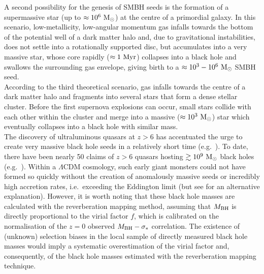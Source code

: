 A second possibility for the genesis of SMBH seeds is the formation of a supermassive star (up to $\approx 10^6~\rm M_\odot$) 
at the centre of a primordial galaxy. 
In this scenario, low-metallicity, low-angular momentum gas infalls towards the bottom of the potential well of a dark matter halo and, 
due to gravitational instabilities, does not settle into a rotationally supported disc, 
but accumulates into a very massive star, 
whose core rapidly ($\approx 1~\rm Myr$) collapses into a black hole and swallows the surrounding gas envelope, 
giving birth to a $\approx 10^3 - 10^6~\rm M_\odot$ SMBH seed. \\

According to the third theoretical scenario, gas infalls towards the centre of a dark matter halo and fragments into several stars
that form a dense stellar cluster. 
Before the first supernova explosions can occur, small stars collide with each other within the cluster 
and merge into a massive ($\approx 10^3~\rm M_\odot$) star which eventually collapses into a black hole with similar mass. \\

The discovery of ultraluminous quasars at $z>6$ has accentuated the urge to create very massive black hole seeds in a relatively short time 
(e.g.~\citealt{alexandernatarajan2014,madau2014,lupi2015}). 
To date, there have been nearly 50 claims of $z>6$ quasars hosting $\gtrsim 10^9~\rm M_\odot$ black holes 
(e.g.~\citealt{fan2003,jiang2007,mortlock2011,banados2014,trakhtenbrot2015,wu2015}). 
Within a $\Lambda$CDM cosmology, such early giant monsters could not have formed so quickly 
without the creation of anomalously massive seeds 
or incredibly high accretion rates, i.e.~exceeding the Eddington limit 
(but see \citealt{meliamcclintock2015} for an alternative explanation). 
However, it is worth noting that these black hole masses are calculated with the reverberation mapping method, 
assuming that $M_{\rm BH}$ is directly proportional to the virial factor $f$, 
which is calibrated on the normalisation of the $z=0$ observed $M_{\rm BH} - \sigma_*$ correlation. 
The existence of (unknown) selection biases in the local sample of directly measured black hole masses 
would imply a systematic overestimation of the virial factor and, consequently, 
of the black hole masses estimated with the reverberation mapping technique. \\


